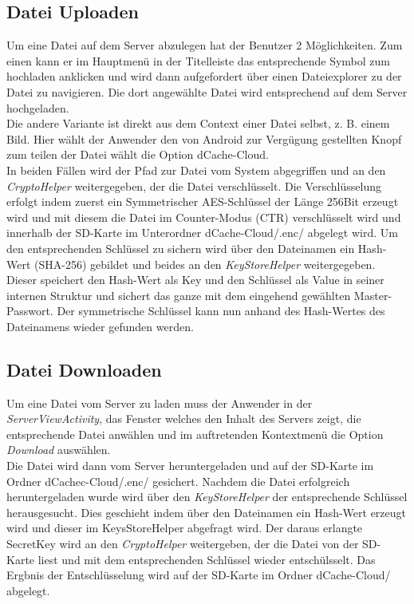 \documentclass[10pt, a4paper,headsepline]{scrreprt}
\begin{document}
\subsection{Datei Uploaden}
Um eine Datei auf dem Server abzulegen hat der Benutzer 2 Möglichkeiten. Zum einen kann er im Hauptmenü in der Titelleiste das entsprechende Symbol zum hochladen anklicken und wird dann aufgefordert über einen Dateiexplorer zu der Datei zu navigieren. Die dort angewählte Datei wird entsprechend auf dem Server hochgeladen. \\
Die andere Variante ist direkt aus dem Context einer Datei selbst, z. B. einem Bild. Hier wählt der Anwender den von Android zur Vergügung gestellten Knopf zum teilen der Datei wählt die Option dCache-Cloud. \\
In beiden Fällen wird der Pfad zur Datei vom System abgegriffen und an den \textit{CryptoHelper} weitergegeben, der die Datei  verschlüsselt. Die Verschlüsselung erfolgt indem zuerst ein Symmetrischer AES-Schlüssel der Länge 256Bit erzeugt wird und mit diesem die Datei im Counter-Modus (CTR) verschlüsselt wird und innerhalb der SD-Karte im Unterordner dCache-Cloud/.enc/ abgelegt wird. Um den entsprechenden Schlüssel zu sichern wird über den Dateinamen ein Hash-Wert (SHA-256) gebildet und beides an den \textit{KeyStoreHelper} weitergegeben. Dieser speichert den  Hash-Wert als Key und den Schlüssel als Value in seiner internen Struktur und sichert das ganze mit dem eingehend gewählten Master-Passwort. Der symmetrische Schlüssel kann nun anhand des Hash-Wertes des Dateinamens wieder gefunden werden.


\subsection{Datei Downloaden}
Um eine Datei vom Server zu laden muss der Anwender in der \textit{ServerViewActivity}, das Fenster welches den Inhalt des Servers zeigt, die entsprechende Datei anwählen und im auftretenden Kontextmenü die Option \textit{Download} auswählen.  \\
Die Datei wird dann vom Server heruntergeladen und auf der SD-Karte im Ordner dCachec-Cloud/.enc/ gesichert. Nachdem die Datei erfolgreich heruntergeladen wurde wird über den \textit{KeyStoreHelper} der entsprechende Schlüssel herausgesucht. Dies geschieht indem über den Dateinamen ein Hash-Wert erzeugt wird und dieser im KeysStoreHelper abgefragt wird. Der daraus erlangte SecretKey wird an den \textit{CryptoHelper} weitergeben, der die Datei von der SD-Karte liest und mit dem entsprechenden Schlüssel wieder entschülsselt. Das Ergbnis der Entschlüsselung wird auf der SD-Karte im Ordner dCache-Cloud/ abgelegt.
\end{document}
